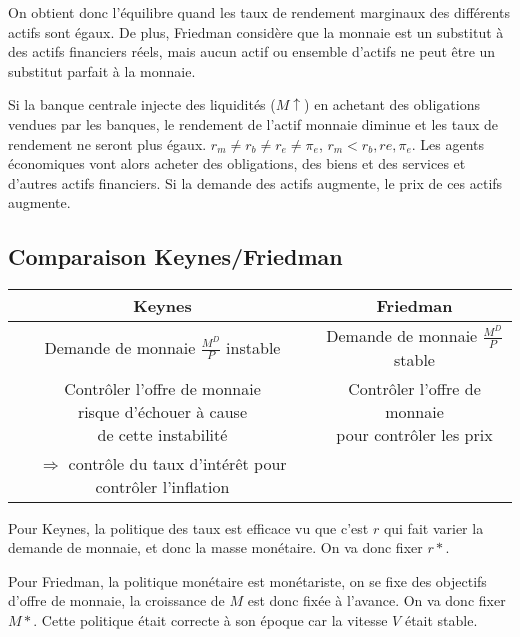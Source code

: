 	
	On obtient donc l'équilibre quand les taux de rendement marginaux des différents actifs sont égaux. De plus, Friedman considère que la monnaie est un substitut à des actifs financiers réels, mais aucun actif ou ensemble d'actifs ne peut être un substitut parfait à la monnaie.
	
	Si la banque centrale injecte des liquidités ($M \uparrow$) en achetant des obligations vendues par les banques, le rendement de l'actif monnaie diminue et les taux de rendement ne seront plus égaux. $r_m \neq r_b \neq r_e \neq \pi_e$, $r_m < r_b, re, \pi_e$. Les agents économiques vont alors acheter des obligations, des biens et des services et d'autres actifs financiers. Si la demande des actifs augmente, le prix de ces actifs augmente.
	

	\subsection{Comparaison Keynes/Friedman}
	
\begin{center}
 	\begin{tabular}{|c|c|}
	\hline 
	Keynes & Friedman \\ 
	\hline 
	Demande de monnaie $\frac{M^D}{P}$ instable & Demande de monnaie $\frac{M^D}{P}$ stable \\ 
	\hline 
	\specialcell{Contrôler l'offre de monnaie \\ risque d'échouer à cause \\ de cette instabilité} & \specialcell{Contrôler l'offre de monnaie \\ pour contrôler les prix} \\  
	\specialcell{$\Rightarrow$ contrôle du taux d'intérêt \\ pour contrôler l'inflation} &  \\ 
	\hline 
	\end{tabular}
 \end{center} 
 
 	Pour Keynes, la politique des taux est efficace vu que c'est $r$ qui fait varier la demande de monnaie, et donc la masse monétaire. On va donc fixer $r*$.
 	
 	Pour Friedman, la politique monétaire est monétariste, on se fixe des objectifs d'offre de monnaie, la croissance de $M$ est donc fixée à l'avance. On va donc fixer $M*$. Cette politique était correcte à son époque car la vitesse $V$ était stable.